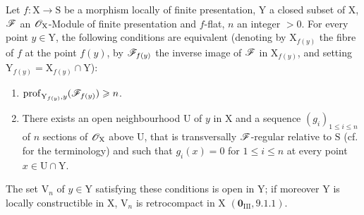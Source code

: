 \begin{proposition}[19.9.6]
\label{IV.19.9.6}
Let $f:\mathrm{X}\to\mathrm{S}$ be a morphism locally of finite presentation, $\mathrm{Y}$ a closed subset of $\mathrm{X}$, $\mathscr{F}$ an $\mathscr{O}_\mathrm{X}$-Module of finite presentation and $f$-flat, $n$ an integer $>0$. For every point $y\in\mathrm{Y}$, the following conditions are equivalent \textup{(}denoting by $\mathrm{X}_{f(y)}$ the fibre of $f$ at the point $f(y)$, by $\mathscr{F}_{f(y)}$ the inverse image of $\mathscr{F}$ in $\mathrm{X}_{f(y)}$, and setting $\mathrm{Y}_{f(y)}=\mathrm{X}_{f(y)}\cap\mathrm{Y}$\textup{)}:
\begin{enumerate}
\item[\rm a)] $\operatorname{prof}_{\mathrm{Y}_{f(y)},y}(\mathscr{F}_{f(y)})\geqslant n$.
\item[\rm b)] There exists an open neighbourhood $\mathrm{U}$ of $y$ in $\mathrm{X}$ and a sequence $(g_i)_{1\leqslant i\leqslant n}$ of $n$ sections of $\mathscr{O}_\mathrm{X}$ above $\mathrm{U}$, that is transversally $\mathscr{F}$-regular relative to $\mathrm{S}$ \textup{(cf. } for the terminology\textup{)} and such that $g_i(x)=0$ for $1\leqslant i\leqslant n$ at every point $x\in\mathrm{U}\cap\mathrm{Y}$.
\end{enumerate}

The set $\mathrm{V}_n$ of $y\in\mathrm{Y}$ satisfying these conditions is open in $\mathrm{Y}$; if moreover $\mathrm{Y}$ is locally constructible in $\mathrm{X}$, $\mathrm{V}_n$ is retrocompact in $\mathrm{X}$ $(\mathbf{0}_\mathrm{III},9.1.1)$.
\end{proposition}

